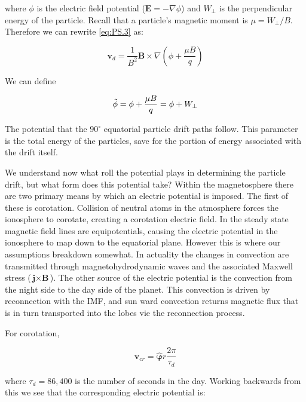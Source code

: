 \documentclass[utf8]{report}
\begin{document}
where $\phi$ is the electric field potential ($\textbf{E} = -\nabla\phi$) and $W_{\perp}$ is the perpendicular energy of the particle. Recall that a particle's magnetic moment is $\mu = W_{\perp}/B$. Therefore we can rewrite \ref{eq:PS.3} as:

\begin{equation}
    \textbf{v}_{d} = \frac{1}{B^{2}}\textbf{B} \times \nabla ( \phi + \frac{\mu B}{q} )
    \label{eq:PS.4}
\end{equation}

We can define 

\begin{equation}
    \Tilde{\phi} = \phi + \frac{\mu B}{q} = \phi + W_{\perp}
    \label{eq:PS.5}
\end{equation}

The potential that the $90^{\circ}$ equatorial particle drift paths follow. This parameter is the total energy of the particles, save for the portion of energy associated with the drift itself. 

We understand now what roll the potential plays in determining the particle drift, but what form does this potential take? Within the magnetosphere there are two primary means by which an electric potential is imposed. The first of these is corotation. Collision of neutral atoms in the atmosphere forces the ionosphere to corotate, creating a corotation electric field. In the steady state magnetic field lines are equipotentials, causing the electric potential in the ionosphere to map down to the equatorial plane. However this is where our assumptions breakdown somewhat. In actuality the changes in convection are transmitted through magnetohydrodynamic waves and the associated Maxwell stress ($\textbf{j} \times \textbf{B}$). The other source of the electric potential is the convection from the night side to the day side of the planet. This convection is driven by reconnection with the IMF, and sun ward convection returns magnetic flux that is in turn transported into the lobes vie the reconnection process. 

For corotation, 

\begin{equation}
    \textbf{v}_{cr} = \hat{\boldsymbol{\varphi}} r \frac{2\pi}{\tau_{d}}
    \label{eq:PS.6}
\end{equation}

where $\tau_{d} = 86,400$ is the number of seconds in the day. Working backwards from this we see that the corresponding electric potential is: 
\end{document}
